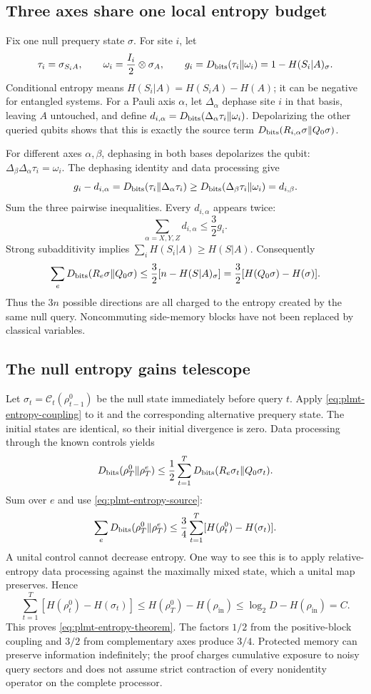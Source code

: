 \documentclass[11pt,a4paper]{article}
\numberwithin{equation}{section}
\theoremstyle{definition}
\theoremstyle{remark}
\begin{document}
\subsection{Three axes share one local entropy budget}
Fix one null prequery state \(\sigma\). For site \(i\), let
\[
 \tau_i=\sigma_{S_iA},\qquad
 \omega_i=\frac{I_i}{2}\otimes\sigma_A,\qquad
 g_i=D_{\rm bits}(\tau_i\Vert\omega_i)=1-H(S_i|A)_\sigma.
\]
Conditional entropy means
\(H(S_i|A)=H(S_iA)-H(A)\); it can be negative for entangled systems. For a Pauli axis \(\alpha\), let \(\Delta_\alpha\) dephase site \(i\) in that basis, leaving \(A\) untouched, and define
\(d_{i,\alpha}=D_{\rm bits}(\Delta_\alpha\tau_i\Vert\omega_i)\).
Depolarizing the other queried qubits shows that this is exactly the source term \(D_{\rm bits}(R_{i,\alpha}\sigma\Vert Q_0\sigma)\).

For different axes \(\alpha,\beta\), dephasing in both bases depolarizes the qubit:
\(\Delta_\beta\Delta_\alpha\tau_i=\omega_i\).
The dephasing identity and data processing give
\[
 g_i-d_{i,\alpha}
 =D_{\rm bits}(\tau_i\Vert\Delta_\alpha\tau_i)
 \geq D_{\rm bits}(\Delta_\beta\tau_i\Vert\omega_i)
 =d_{i,\beta}.
\]
Sum the three pairwise inequalities. Every \(d_{i,\alpha}\) appears twice:
\[
 \sum_{\alpha=X,Y,Z}d_{i,\alpha}\leq\frac32g_i.
\]
Strong subadditivity implies
\(\sum_iH(S_i|A)\geq H(S|A)\). Consequently
\begin{equation}
 \sum_eD_{\rm bits}(R_e\sigma\Vert Q_0\sigma)
 \leq\frac32[n-H(S|A)_\sigma]
 =\frac32[H(Q_0\sigma)-H(\sigma)].
 \label{eq:plmt-entropy-source}
\end{equation}
Thus the \(3n\) possible directions are all charged to the entropy created by the same null query. Noncommuting side-memory blocks have not been replaced by classical variables.

\subsection{The null entropy gains telescope}
Let \(\sigma_t=\mathcal C_t(\rho_{t-1}^0)\) be the null state immediately before query \(t\). Apply \eqref{eq:plmt-entropy-coupling} to it and the corresponding alternative prequery state. The initial states are identical, so their initial divergence is zero. Data processing through the known controls yields
\[
 D_{\rm bits}(\rho_T^0\Vert\rho_T^e)
 \leq\frac12\sum_{t=1}^T
 D_{\rm bits}(R_e\sigma_t\Vert Q_0\sigma_t).
\]
Sum over \(e\) and use \eqref{eq:plmt-entropy-source}:
\[
 \sum_eD_{\rm bits}(\rho_T^0\Vert\rho_T^e)
 \leq\frac34\sum_{t=1}^T
 [H(\rho_t^0)-H(\sigma_t)].
\]
A unital control cannot decrease entropy. One way to see this is to apply relative-entropy data processing against the maximally mixed state, which a unital map preserves. Hence
\[
 \sum_{t=1}^T[H(\rho_t^0)-H(\sigma_t)]
 \leq H(\rho_T^0)-H(\rho_{\mathrm{in}})
 \leq\log_2D-H(\rho_{\mathrm{in}})=C.
\]
This proves \eqref{eq:plmt-entropy-theorem}. The factors \(1/2\) from the positive-block coupling and \(3/2\) from complementary axes produce \(3/4\). Protected memory can preserve information indefinitely; the proof charges cumulative exposure to noisy query sectors and does not assume strict contraction of every nonidentity operator on the complete processor.
\end{document}

